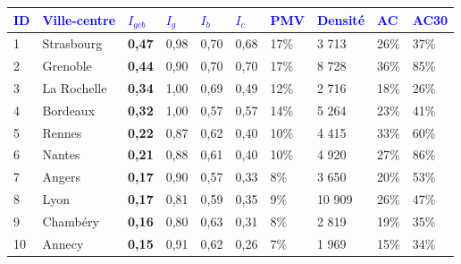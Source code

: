         \begin{longtable}{p{0.5cm}p{4cm}p{0.5cm}p{0.5cm}p{0.5cm}p{0.5cm}p{1cm}p{1cm}p{1cm}p{1cm}}
        \hline
        \small{\textcolor{blue}{\textbf{ID}}} & \small{\textcolor{blue}{\textbf{Ville-centre}}} & \small{\textcolor{blue}{\textbf{$I_{gcb}$}}} & \small{\textcolor{blue}{\textbf{$I_{g}$}}} & \small{\textcolor{blue}{\textbf{$I_{b}$}}} & \small{\textcolor{blue}{\textbf{$I_{c}$}}} & \small{\textcolor{blue}{\textbf{PMV}}} & \small{\textcolor{blue}{\textbf{Densité}}} & \small{\textcolor{blue}{\textbf{AC}}} & \small{\textcolor{blue}{\textbf{AC30}}}\\
        \hline
        \endhead
    \small{1} & \small{Strasbourg} & \small{\textbf{0,47}} & \small{0,98} & \small{0,70} & \small{0,68} & \small{17\%} & \small{3 713} & \small{26\%} & \small{37\%}\\
    \small{2} & \small{Grenoble} & \small{\textbf{0,44}} & \small{0,90} & \small{0,70} & \small{0,70} & \small{17\%} & \small{8 728} & \small{36\%} & \small{85\%}\\
    \small{3} & \small{La Rochelle} & \small{\textbf{0,34}} & \small{1,00} & \small{0,69} & \small{0,49} & \small{12\%} & \small{2 716} & \small{18\%} & \small{26\%}\\
    \small{4} & \small{Bordeaux} & \small{\textbf{0,32}} & \small{1,00} & \small{0,57} & \small{0,57} & \small{14\%} & \small{5 264} & \small{23\%} & \small{41\%}\\
    \small{5} & \small{Rennes} & \small{\textbf{0,22}} & \small{0,87} & \small{0,62} & \small{0,40} & \small{10\%} & \small{4 415} & \small{33\%} & \small{60\%}\\
    \small{6} & \small{Nantes} & \small{\textbf{0,21}} & \small{0,88} & \small{0,61} & \small{0,40} & \small{10\%} & \small{4 920} & \small{27\%} & \small{86\%}\\
    \small{7} & \small{Angers} & \small{\textbf{0,17}} & \small{0,90} & \small{0,57} & \small{0,33} & \small{8\%} & \small{3 650} & \small{20\%} & \small{53\%}\\
    \small{8} & \small{Lyon} & \small{\textbf{0,17}} & \small{0,81} & \small{0,59} & \small{0,35} & \small{9\%} & \small{10 909} & \small{26\%} & \small{47\%}\\
    \small{9} & \small{Chambéry} & \small{\textbf{0,16}} & \small{0,80} & \small{0,63} & \small{0,31} & \small{8\%} & \small{2 819} & \small{19\%} & \small{35\%}\\
    \small{10} & \small{Annecy} & \small{\textbf{0,15}} & \small{0,91} & \small{0,62} & \small{0,26} & \small{7\%} & \small{1 969} & \small{15\%} & \small{34\%}\\

\end{longtable}
